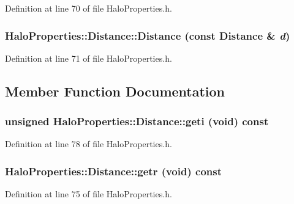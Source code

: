 Definition at line 70 of file HaloProperties.h.

\subsubsection[{Distance}]{\setlength{\rightskip}{0pt plus 5cm}HaloProperties::Distance::Distance (const {\bf Distance} \& {\em d})}\label{classHaloProperties_1_1Distance_a594dfe62444d01c25086c49a08943f2b}


Definition at line 71 of file HaloProperties.h.



\subsection{Member Function Documentation}
\subsubsection[{geti}]{\setlength{\rightskip}{0pt plus 5cm}unsigned HaloProperties::Distance::geti (void) const}\label{classHaloProperties_1_1Distance_ac766c39cfbe332a30b59b833cdc5a539}


Definition at line 78 of file HaloProperties.h.

\subsubsection[{getr}]{ HaloProperties::Distance::getr (void) const}\label{classHaloProperties_1_1Distance_a22fd65c6215b7dbf9d0bd9770df8983f}


Definition at line 75 of file HaloProperties.h.

